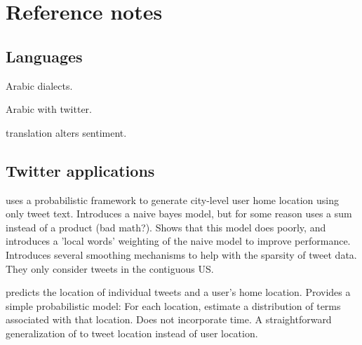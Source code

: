 \documentclass{article}
\begin{document}
\noindent

\noindent

\noindent

\noindent

\noindent

\noindent

\noindent

\noindent

\noindent

\noindent


\newpage
\section{Reference notes}


\subsection{Languages}

\citet{zaidan2014arabic} Arabic dialects.

\citet{refaee2014arabic} Arabic with twitter.

\citet{mohammad2016translation} translation alters sentiment.


\subsection{Twitter applications}

\citet{cheng2010you} uses a probabilistic framework to generate city-level user home location using only tweet text.
Introduces a naive bayes model, but for some reason uses a sum instead of a product (bad math?).
Shows that this model does poorly,
and introduces a 'local words' weighting of the naive model to improve performance.
Introduces several smoothing mechanisms to help with the sparsity of tweet data.
They only consider tweets in the contiguous US.

\citet{kinsella2011m} predicts the location of individual tweets and a user's home location.
Provides a simple probabilistic model: 
For each location, estimate a distribution of terms associated with that location.
Does not incorporate time.
A straightforward generalization of \citet{cheng2010you} to tweet location instead of user location.
\end{document}
